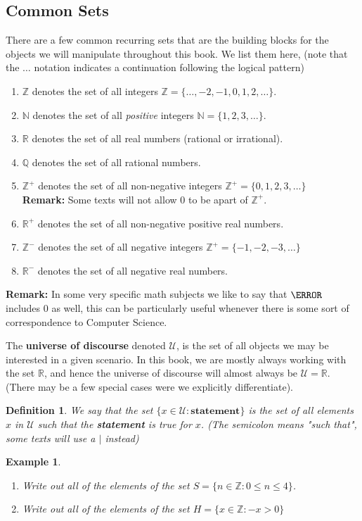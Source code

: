 \documentclass[12pt]{article}
\newcommand{\R}{\mathbb{R}}
\theoremstyle{break}
\newtheorem{ex}[thm]{Example}
\newtheorem{defn}{Definition}[subsection]
\begin{document}
\newpage


\subsection{Common Sets}
There are a few common recurring sets that are the building blocks for the objects we will manipulate throughout this book. We list them here, (note that the $\dots$ notation indicates a continuation following the logical pattern)




\begin{enumerate}
\item $\mathbb Z$ denotes the set of all integers $\mathbb Z = \{\dots,-2,-1,0,1,2,\dots \}$.
\item $\mathbb N$ denotes the set of all \emph{positive} integers $\mathbb N = \{1,2,3,\dots \}$.
\item $\mathbb R$ denotes the set of all real numbers (rational or irrational). 
\item $\mathbb Q$ denotes the set of all rational numbers.
\item $\mathbb Z^+$ denotes the set of all non-negative integers $\mathbb Z^+ = \{0,1,2,3,\dots\}$\\
\textbf{Remark:} Some texts will not allow $0$ to be apart of $\mathbb Z^+$.
\item $\mathbb R^+$ denotes the set of all non-negative positive real numbers.
\item $\mathbb Z^-$ denotes the set of all negative integers $\mathbb Z^+ = \{-1,-2,-3,\dots\}$
\item $\mathbb R^-$ denotes the set of all negative real numbers.
\end{enumerate}



\textbf{Remark: }In some very specific math subjects we like to say that $\N$ includes $0$ as well, this can be particularly useful whenever there is some sort of correspondence to Computer Science. 

The \textbf{universe of discourse} denoted $\mathcal{U}$, is the set of all objects we may be interested in a given scenario. In this book, we are mostly always working with the set $\R$, and hence the universe of discourse will almost always be $\mathcal{U} = \R$. (There may be a few special cases were we explicitly differentiate). 





\begin{defn}
We say that the set $\{x\in \mathcal{U} \colon \textbf{statement} \}$ is the set of all elements $x$ in $\mathcal{U}$ such that the \textbf{statement} is true for $x$. (The semicolon means "such that", some texts will use a $|$ instead)
\end{defn}
\newpage

\begin{ex}
	\begin{enumerate}[label = (\alph*)]
		\item Write out all of the elements of the set $S = \{n\in \mathbb Z \colon 0 \leq n \leq 4 \}$.
		\item Write out all of the elements of the set $H = \{x \in \mathbb Z \colon -x > 0 \}$
	\end{enumerate}


\end{ex}
\end{document}
